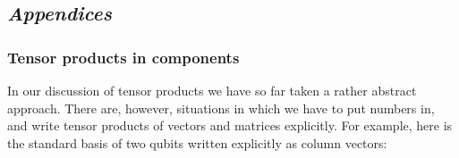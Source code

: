 \documentclass[fleqn]{article}
\begin{document}
\hypertarget{appendices}{%
\subsection{\texorpdfstring{\emph{Appendices}}{Appendices}}\label{appendices}}

\hypertarget{tensor-products-in-components}{%
\subsubsection{Tensor products in components}\label{tensor-products-in-components}}

In our discussion of tensor products we have so far taken a rather abstract approach.
There are, however, situations in which we have to put numbers in, and write tensor products of vectors and matrices explicitly.
For example, here is the standard basis of two qubits written explicitly as column vectors:
\end{document}
